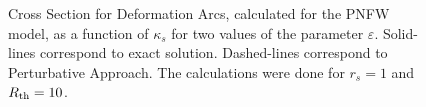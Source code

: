 \begin{figure}[!ht]
\caption{\label{siep_curves}  Cross Section for Deformation Arcs, calculated
for the PNFW model, as a function of $\kappa_s$ for two values of the parameter
$\varepsilon$. Solid-lines correspond to exact solution. Dashed-lines correspond
to Perturbative Approach. The calculations were done for $r_s=1$ and
$R_{\rm th}=10$.}
\end{figure}


